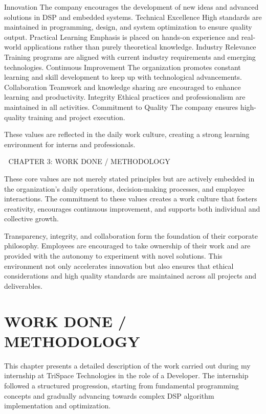 \documentclass[12pt,a4paper]{report}
\begin{document}
Innovation The company encourages the development of new ideas and advanced solutions in DSP and embedded systems. Technical Excellence High standards are maintained in programming, design, and system optimization to ensure quality output. Practical Learning Emphasis is placed on hands-on experience and real-world applications rather than purely theoretical knowledge. Industry Relevance Training programs are aligned with current industry requirements and emerging technologies. Continuous Improvement The organization promotes constant learning and skill development to keep up with technological advancements. Collaboration Teamwork and knowledge sharing are encouraged to enhance learning and productivity. Integrity Ethical practices and professionalism are maintained in all activities. Commitment to Quality The company ensures high-quality training and project execution.


These values are reflected in the daily work culture, creating a strong learning environment for interns and professionals.


🔷 CHAPTER 3: WORK DONE / METHODOLOGY


These core values are not merely stated principles but are actively embedded in the organization's daily operations, decision-making processes, and employee interactions. The commitment to these values creates a work culture that fosters creativity, encourages continuous improvement, and supports both individual and collective growth.


Transparency, integrity, and collaboration form the foundation of their corporate philosophy. Employees are encouraged to take ownership of their work and are provided with the autonomy to experiment with novel solutions. This environment not only accelerates innovation but also ensures that ethical considerations and high quality standards are maintained across all projects and deliverables.




\chapter{WORK DONE / METHODOLOGY}
\label{ch:work}


This chapter presents a detailed description of the work carried out during my internship at TriSpace Technologies in the role of a Developer. The internship followed a structured progression, starting from fundamental programming concepts and gradually advancing towards complex DSP algorithm implementation and optimization.
\end{document}
